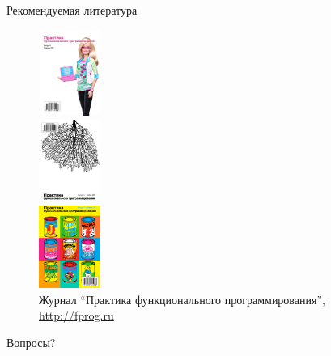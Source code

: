 \documentclass{beamer}
\begin{document}
\begin{frame}{Рекомендуемая литература}
  \begin{figure}
    \begin{minipage}{0.3\linewidth}
      \begin{center}
        \includegraphics[width=20mm]{lecture0/pfp2010-04.eps}
      \end{center}
    \end{minipage}
    \begin{minipage}{0.3\linewidth}
      \begin{center}
        \includegraphics[width=20mm]{lecture0/pfp2010-06.eps}
      \end{center}
    \end{minipage}
    \begin{minipage}{0.3\linewidth}
      \begin{center}
        \includegraphics[width=20mm]{lecture0/pfp2011-07.eps}
      \end{center}
    \end{minipage}
    \caption{Журнал ``Практика функционального программирования'',
      \url{http://fprog.ru}}
  \end{figure}
\end{frame}

\begin{frame}
  \begin{center}
    \LARGE{Вопросы?}
  \end{center}
\end{frame}
\end{document}

